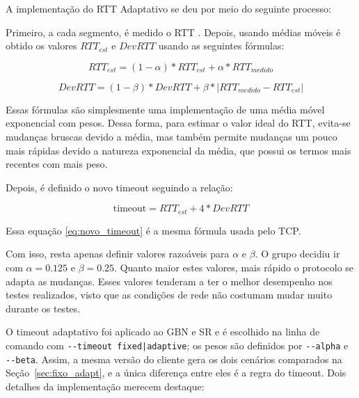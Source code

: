 \documentclass[11pt,a4paper]{article}
\begin{document}
A implementação do RTT Adaptativo se deu por meio do seguinte processo:

Primeiro, a cada segmento, é medido o RTT . Depois, usando médias móveis é obtido os valores $RTT_{est}$ e $DevRTT$ usando as seguintes fórmulas:

\begin{equation}
RTT_{est} = (1 - \alpha) * RTT_{est} + \alpha * RTT_{medido}
\label{eq:EWMA}
\end{equation}

\begin{equation}
	DevRTT = (1 - \beta) * DevRTT + \beta * | RTT_{medido} - RTT_{est} |
\label{eq:Devrtt}
\end{equation}

Essas fórmulas são simplesmente uma implementação de uma média móvel exponencial com pesos. 
Dessa forma, para estimar o valor ideal do RTT, evita-se mudanças bruscas devido a média, mas também permite 
mudanças um pouco mais rápidas devido a natureza exponencial da média, que possui os termos mais
recentes com mais peso.

Depois, é definido o novo timeout seguindo a relação:

\begin{equation}
	\text{timeout} = RTT_{est} + 4 * DevRTT
	\label{eq:novo_timeout}
\end{equation}

Essa equação \ref{eq:novo_timeout} é a mesma fórmula usada pelo TCP.

Com isso, resta apenas definir valores razoáveis para $\alpha$ e $\beta$. O grupo decidiu ir com $\alpha = 0.125$ e $\beta = 0.25$. Quanto maior estes valores,
mais rápido o protocolo se adapta as mudanças. Esses valores tenderam a ter o melhor desempenho nos testes realizados, visto que as condições de rede
não costumam mudar muito durante os testes.

\label{sec:impl_rtt}
O timeout adaptativo foi aplicado ao GBN e SR e é escolhido na linha de
comando com \texttt{-{}-timeout fixed|adaptive}; os pesos são definidos por
\texttt{-{}-alpha} e \texttt{-{}-beta}. Assim, a mesma versão do cliente gera os
dois cenários comparados na Seção~\ref{sec:fixo_adapt}, e a única diferença entre
eles é a regra do timeout. Dois detalhes da implementação merecem destaque:
\end{document}

